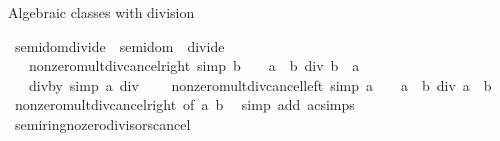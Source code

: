 \begin{isabellebody}
\endisatagML
{\isafoldML}%
%
\isadelimML
%
\endisadelimML
%
\begin{isamarkuptext}%
Algebraic classes with division%
\end{isamarkuptext}\isamarkuptrue%
\isamarkupfalse%
\ semidom{\isacharunderscore}{\kern0pt}divide\ {\isacharequal}{\kern0pt}\ semidom\ {\isacharplus}{\kern0pt}\ divide\ {\isacharplus}{\kern0pt}\isanewline
\ \ \ nonzero{\isacharunderscore}{\kern0pt}mult{\isacharunderscore}{\kern0pt}div{\isacharunderscore}{\kern0pt}cancel{\isacharunderscore}{\kern0pt}right\ {\isacharbrackleft}{\kern0pt}simp{\isacharbrackright}{\kern0pt}{\isacharcolon}{\kern0pt}\ {\isachardoublequoteopen}b\ {\isasymnoteq}\ {}\ {\isasymLongrightarrow}\ {\isacharparenleft}{\kern0pt}a\ {\isacharasterisk}{\kern0pt}\ b{\isacharparenright}{\kern0pt}\ div\ b\ {\isacharequal}{\kern0pt}\ a{\isachardoublequoteclose}\isanewline
\ \ \ div{\isacharunderscore}{\kern0pt}by{\isacharunderscore}{\kern0pt}{}\ {\isacharbrackleft}{\kern0pt}simp{\isacharbrackright}{\kern0pt}{\isacharcolon}{\kern0pt}\ {\isachardoublequoteopen}a\ div\ {}\ {\isacharequal}{\kern0pt}\ {}{\isachardoublequoteclose}\isanewline
{}\isanewline
\isanewline
{}\isamarkupfalse%
\ nonzero{\isacharunderscore}{\kern0pt}mult{\isacharunderscore}{\kern0pt}div{\isacharunderscore}{\kern0pt}cancel{\isacharunderscore}{\kern0pt}left\ {\isacharbrackleft}{\kern0pt}simp{\isacharbrackright}{\kern0pt}{\isacharcolon}{\kern0pt}\ {\isachardoublequoteopen}a\ {\isasymnoteq}\ {}\ {\isasymLongrightarrow}\ {\isacharparenleft}{\kern0pt}a\ {\isacharasterisk}{\kern0pt}\ b{\isacharparenright}{\kern0pt}\ div\ a\ {\isacharequal}{\kern0pt}\ b{\isachardoublequoteclose}\isanewline
%
\isadelimproof
\ \ %
\endisadelimproof
%
\isatagproof
{}\isamarkupfalse%
\ nonzero{\isacharunderscore}{\kern0pt}mult{\isacharunderscore}{\kern0pt}div{\isacharunderscore}{\kern0pt}cancel{\isacharunderscore}{\kern0pt}right\ {\isacharbrackleft}{\kern0pt}of\ a\ b{\isacharbrackright}{\kern0pt}\ \isamarkupfalse%
\ {\isacharparenleft}{\kern0pt}simp\ add{\isacharcolon}{\kern0pt}\ ac{\isacharunderscore}{\kern0pt}simps{\isacharparenright}{\kern0pt}%
\endisatagproof
{\isafoldproof}%
%
\isadelimproof
\isanewline
%
\endisadelimproof
\isanewline
{}\isamarkupfalse%
\ semiring{\isacharunderscore}{\kern0pt}no{\isacharunderscore}{\kern0pt}zero{\isacharunderscore}{\kern0pt}divisors{\isacharunderscore}{\kern0pt}cancel\isanewline

\end{isabellebody}
